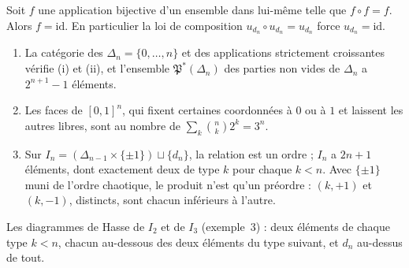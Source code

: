 \begin{enonce}
Soit $f$ une application bijective d'un ensemble dans lui-même telle que $f \circ f = f$. Alors $f = \mathrm{id}$. En particulier la loi de composition $u_{d_n} \circ u_{d_n} = u_{d_n}$ force $u_{d_n} = \mathrm{id}$.
\end{enonce}

\begin{enonce}
\begin{enumerate}
\item La catégorie des $\Delta_n = \{0, \dots, n\}$ et des applications strictement croissantes vérifie (i) et (ii), et l'ensemble $\mathfrak P^*(\Delta_n)$ des parties non vides de $\Delta_n$ a $2^{n+1} - 1$ éléments.
\item Les faces de $[0,1]^n$, qui fixent certaines coordonnées à $0$ ou à $1$ et laissent les autres libres, sont au nombre de $\sum_{k} \binom nk 2^k = 3^n$.
\item Sur $I_n = (\Delta_{n-1} \times \{\pm 1\}) \sqcup \{d_n\}$, la relation  est un ordre ; $I_n$ a $2n + 1$ éléments, dont exactement deux de type $k$ pour chaque $k < n$. Avec $\{\pm 1\}$ muni de l'ordre chaotique, le produit n'est qu'un préordre : $(k, +1)$ et $(k, -1)$, distincts, sont chacun inférieurs à l'autre.
\end{enumerate}
\end{enonce}

Les diagrammes de Hasse de $I_2$ et de $I_3$ (exemple~3) : deux éléments de chaque type $k < n$, chacun au-dessous des deux éléments du type suivant, et $d_n$ au-dessus de tout.
\begin{center}
\end{center}


